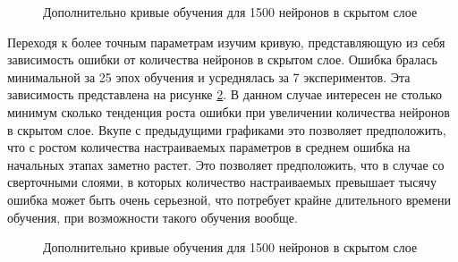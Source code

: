 \documentclass[utf8,usehyperref,14pt]{G7-32}
\begin{document}
\begin{figure}[H]
  \caption{Дополнительно кривые обучения для 1500 нейронов в скрытом слое}\label{ALOPEX_sum_3}
\end{figure}

Переходя к более точным параметрам изучим кривую, представляющую из себя зависимость ошибки от количества нейронов в скрытом слое. Ошибка бралась минимальной за 25 эпох обучения и усреднялась за 7 экспериментов. Эта зависимость представлена на рисунке \ref{ALOPEX_errors}. В данном случае интересен не столько минимум сколько тенденция роста ошибки при увеличении количества нейронов в скрытом слое. Вкупе с предыдущими графиками это позволяет предположить, что с ростом количества настраиваемых параметров в среднем ошибка на начальных этапах заметно растет. Это позволяет предположить, что в случае со сверточными слоями, в которых количество настраиваемых превышает тысячу ошибка может быть очень серьезной, что потребует крайне длительного времени обучения, при возможности такого обучения вообще.

\begin{figure}[H]
  \caption{Дополнительно кривые обучения для 1500 нейронов в скрытом слое}\label{ALOPEX_errors}
\end{figure}
\end{document}
